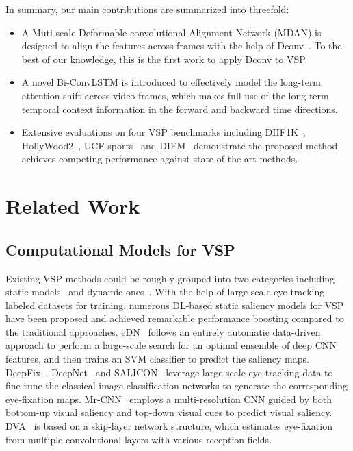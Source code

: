 \documentclass[review]{elsarticle}
\begin{document}
In summary, our main contributions are summarized into threefold:

\begin{itemize}
\item A Muti-scale Deformable convolutional Alignment Network (MDAN) is designed to align the features across frames with the help of Dconv~\cite{zhu2019deformable}. To the best of our knowledge, this is the first work to apply Dconv to VSP.
\item A novel Bi-ConvLSTM is introduced to effectively model the long-term attention shift across video frames, which makes full use of the long-term temporal context information in the forward and backward time directions.
\item Extensive evaluations on four VSP benchmarks including DHF1K~\cite{wang2018revisiting}, HollyWood2~\cite{mathe2014actions}, UCF-sports~\cite{mathe2014actions} and DIEM~\cite{mital2011clustering} demonstrate the proposed method  achieves competing performance against state-of-the-art methods.
\end{itemize}
\section{Related Work}
\subsection{Computational Models for VSP}
Existing VSP methods could be roughly grouped into two categories including static models~\cite{vig2014large,kruthiventi2017deepfix,pan2016shallow,huang2015salicon,liu2016learning,wang2017deep} and dynamic ones~\cite{pan2017salgan,wang2018revisiting,min2019tased,lai2019video}.
With the help of large-scale eye-tracking labeled datasets for training, numerous DL-based static saliency models for VSP~\cite{vig2014large,kruthiventi2017deepfix,pan2016shallow,huang2015salicon,liu2016learning,wang2017deep} have been proposed and achieved remarkable performance boosting compared to the traditional approaches.
eDN~\cite{vig2014large} follows an entirely automatic data-driven approach to perform a large-scale search for an optimal ensemble of deep CNN features, and then trains an SVM classifier to predict the saliency maps.
DeepFix~\cite{kruthiventi2017deepfix}, DeepNet~\cite{pan2016shallow} and SALICON~\cite{huang2015salicon} leverage large-scale eye-tracking data to fine-tune the classical image classification networks to generate the corresponding eye-fixation maps.
Mr-CNN~\cite{liu2016learning} employs a multi-resolution CNN guided by both bottom-up visual saliency and top-down visual cues to predict visual saliency.
DVA~\cite{wang2017deep} is based on a skip-layer network structure, which estimates eye-fixation from multiple convolutional layers with various reception fields.
\end{document}
